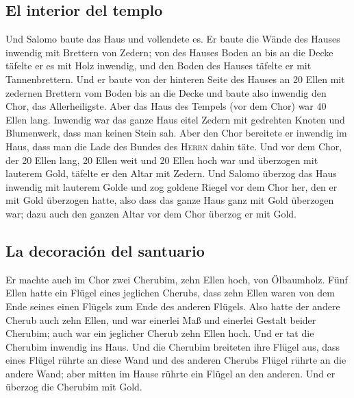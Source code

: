 \hypertarget{el-interior-del-templo}{%
\subsection{El interior del templo}\label{el-interior-del-templo}}

 Und Salomo baute das Haus und vollendete es.
 Er baute die Wände des Hauses inwendig mit Brettern von
Zedern; von des Hauses Boden an bis an die Decke täfelte er es mit Holz
inwendig, und den Boden des Hauses täfelte er mit Tannenbrettern.
 Und er baute von der hinteren Seite des Hauses an 20
Ellen mit zedernen Brettern vom Boden bis an die Decke und baute also
inwendig den Chor, das Allerheiligste.  Aber das Haus des
Tempels (vor dem Chor) war 40 Ellen lang.  Inwendig war
das ganze Haus eitel Zedern mit gedrehten Knoten und Blumenwerk, dass
man keinen Stein sah.  Aber den Chor bereitete er
inwendig im Haus, dass man die Lade des Bundes des \textsc{Herrn} dahin
täte.  Und vor dem Chor, der 20 Ellen lang, 20 Ellen weit
und 20 Ellen hoch war und überzogen mit lauterem Gold, täfelte er den
Altar mit Zedern.  Und Salomo überzog das Haus inwendig
mit lauterem Golde und zog goldene Riegel vor dem Chor her, den er mit
Gold überzogen hatte,  also dass das ganze Haus ganz mit
Gold überzogen war; dazu auch den ganzen Altar vor dem Chor überzog er
mit Gold.

\hypertarget{la-decoraciuxf3n-del-santuario}{%
\subsection{La decoración del
santuario}\label{la-decoraciuxf3n-del-santuario}}

 Er machte auch im Chor zwei Cherubim, zehn Ellen hoch,
von Ölbaumholz.  Fünf Ellen hatte ein Flügel eines
jeglichen Cherubs, dass zehn Ellen waren von dem Ende seines einen
Flügels zum Ende des anderen Flügels.  Also hatte der
andere Cherub auch zehn Ellen, und war einerlei Maß und einerlei Gestalt
beider Cherubim;  auch war ein jeglicher Cherub zehn
Ellen hoch.  Und er tat die Cherubim inwendig ins Haus.
Und die Cherubim breiteten ihre Flügel aus, dass eines Flügel rührte an
diese Wand und des anderen Cherubs Flügel rührte an die andere Wand;
aber mitten im Hause rührte ein Flügel an den anderen. 
Und er überzog die Cherubim mit Gold.

